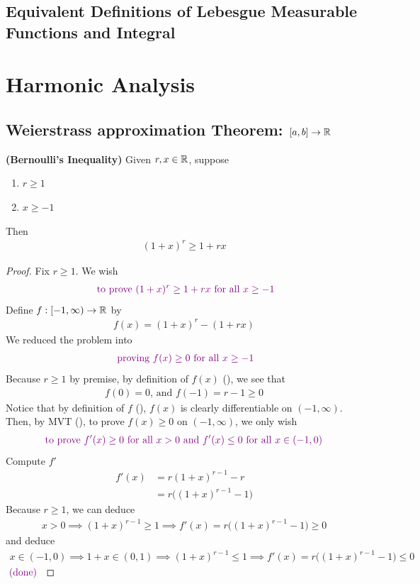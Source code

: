 \documentclass{report}
\begin{document}
\section{Equivalent Definitions of Lebesgue Measurable Functions and Integral}
\chapter{Harmonic Analysis}
\section{Weierstrass approximation Theorem: $[a,b]\rightarrow \mathbb{R}$}
\begin{theorem}
\label{Bernoulli's Inequality}
\textbf{(Bernoulli's Inequality)} Given $r,x \in\mathbb{R}$, suppose 
\begin{enumerate}[label=(\alph*)]
  \item $r\geq 1$ 
  \item $x\geq -1$
\end{enumerate}
Then
\begin{align*}
  (1+x)^r\geq 1+rx
\end{align*}
\end{theorem}
\begin{proof}
Fix $r\geq 1$. We wish 
\begin{align*}
\textcolor{violet}{\text{ to prove }(1+x)^r\geq 1+rx\text{ for all  }x \geq -1}
\end{align*}
Define $f:[-1,\infty)\rightarrow \mathbb{R}$ by 
 \begin{align}
\label{Bere1}
f(x)=(1+x)^r-(1+rx)
\end{align}
We reduced the problem into  
\begin{align*}
\textcolor{violet}{\text{ proving }f(x)\geq 0\text{ for all } x\geq -1}
\end{align*}
Because $r\geq 1$ by premise, by definition of $f(x)$  (), we see that 
\begin{align*}
f(0)=0\text{, and }f(-1)=r-1\geq 0
\end{align*}
Notice that by definition of $f$  (),  $f(x)$ is clearly differentiable on $(-1,\infty)$.\\

Then, by MVT (), to prove $f(x)\geq 0$ on $(-1,\infty)$, we only wish 
\begin{align*}
\textcolor{violet}{\text{ to prove }f'(x)\geq 0\text{ for all }x> 0\text{ and }f'(x)\leq 0\text{ for all $x \in (-1,0)$ }}
\end{align*}
Compute $f'$
 \begin{align*}
f'(x)&=r(1+x)^{r-1}-r\\
&=r\Big((1+x)^{r-1}-1 \Big)
\end{align*}
Because $r\geq 1$, we can deduce 
\begin{align*}
x>0 \implies (1+x)^{r-1}\geq 1 \implies f'(x)=r\Big((1+x)^{r-1}-1 \Big)\geq 0
\end{align*}
and deduce 
\begin{align*}
x \in (-1,0) \implies 1+x \in (0,1) \implies (1+x)^{r-1}\leq 1 \implies f'(x)=r\Big((1+x)^{r-1}-1 \Big)\leq  0
\end{align*}
$\textcolor{violet}{\text{ (done) }}$
\end{proof}
\end{document}
